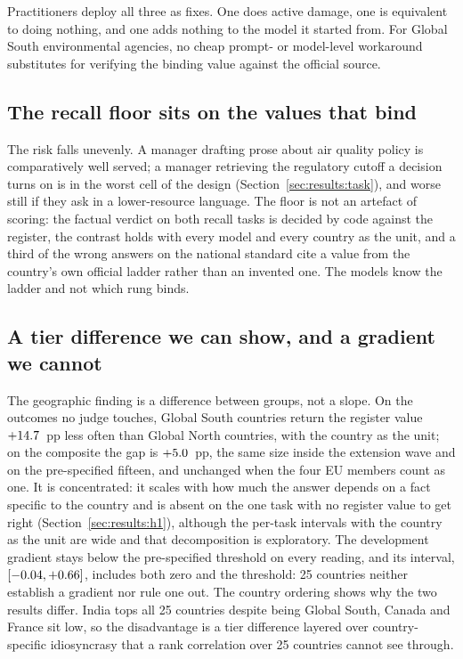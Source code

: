 Practitioners deploy all three as fixes. One does active damage, one is
equivalent to doing nothing, and one adds nothing to the model it started from. For Global South environmental
agencies, no cheap prompt- or model-level workaround substitutes for verifying
the binding value against the official source.

\subsection{The recall floor sits on the values that bind}

The risk falls unevenly. A manager drafting prose about air quality policy is
comparatively well served; a manager retrieving the regulatory cutoff a
decision turns on is in the worst cell of the design
(Section~\ref{sec:results:task}), and worse still if they ask in a
lower-resource language. The floor is not an artefact of scoring: the factual
verdict on both recall tasks is decided by code against the register, the
contrast holds with every model and every country as the unit, and a third of
the wrong answers on the national standard cite a value from the country's own
official ladder rather than an invented one. The models know the ladder and not
which rung binds.

\subsection{A tier difference we can show, and a gradient we cannot}

The geographic finding is a difference between groups, not a slope. On the
outcomes no judge touches, Global South countries return the register value
$+14.7$~pp less often than Global North countries, with the country as the
unit; on the composite the gap is $+5.0$~pp, the same size inside the
extension wave and on the pre-specified fifteen, and unchanged when the four EU
members count as one. It is concentrated: it scales with how much the answer
depends on a fact specific to the country and is absent on the one task with
no register value to get right (Section~\ref{sec:results:h1}), although the
per-task intervals with the country as the unit are wide and that
decomposition is exploratory. The development gradient stays below the
pre-specified threshold on every reading, and its interval, $[-0.04,+0.66]$,
includes both zero and the threshold: 25 countries neither establish a gradient
nor rule one out. The country ordering shows why the two results differ. India
tops all 25 countries despite being Global South, Canada and France sit low, so
the disadvantage is a tier difference layered over country-specific
idiosyncrasy that a rank correlation over 25 countries cannot see through.

